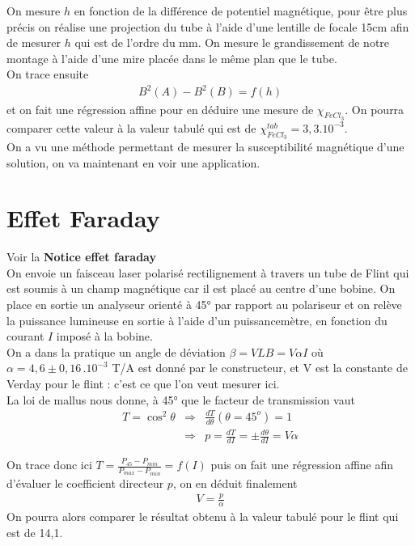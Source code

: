 \documentclass[12pt,prb,aps,epsf]{article}
\begin{document}
On mesure $h$ en fonction de la différence de potentiel magnétique, pour être plus précis on réalise une projection du tube à l'aide d'une lentille de focale 15cm afin de mesurer $h$ qui est de l'ordre du mm. On mesure le grandissement de notre montage à l'aide d'une mire placée dans le même plan que le tube.\\ On trace ensuite 
\begin{eqnarray}
B^2(A) - B^2(B) = f(h)
\end{eqnarray}
et on fait une régression affine pour en déduire une mesure de $\chi_{FeCl_3}$. On pourra comparer cette valeur à la valeur tabulé qui est de $\chi_{FeCl_3}^{tab} = 3,3.10^{-3}$.\\

On a vu une méthode permettant de mesurer la susceptibilité magnétique d'une solution, on va maintenant en voir une application.
	
	
\section{Effet Faraday}
Voir la \textbf{Notice effet faraday}\\

On envoie un faisceau laser polarisé rectilignement à travers un tube de Flint qui est soumis à un champ magnétique car il est placé au centre d'une bobine.	On place en sortie un analyseur orienté à 45° par rapport au polariseur et on relève la puissance lumineuse en sortie à l'aide d'un puissancemètre, en fonction du courant $I$ imposé à la bobine.\\

On a dans la pratique un angle de déviation $\beta = VLB = V\alpha I$ où $\alpha = 4,6\pm0,16 \, .10^{-3}$ T/A est donné par le constructeur, et V est la constante de Verday pour le flint : c'est ce que l'on veut mesurer ici.\\

La loi de mallus nous donne, à 45° que le facteur de transmission vaut 
\begin{eqnarray}
T = \cos^2\theta &\Rightarrow& \frac{dT}{d\theta}(\theta=45^o) = 1\\
&\Rightarrow& p = \frac{dT}{dI} = \pm \frac{d\theta}{dI} = V\alpha
\end{eqnarray}

On trace donc ici $T=\frac{P_{45}-P_{min}}{P_{max}-P_{min}}=f(I)$ puis on fait une régression affine afin d'évaluer le coefficient directeur $p$, on en déduit finalement 
\begin{eqnarray}
V = \frac{p}{\alpha}
\end{eqnarray}
On pourra alors comparer le résultat obtenu à la valeur tabulé pour le flint qui est de 14,1.
\end{document}

